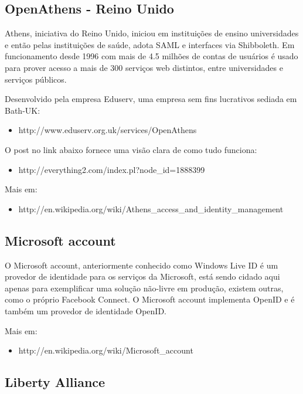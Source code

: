 \documentclass[11pt]{article}
\begin{document}
\subsection{OpenAthens - Reino Unido}

Athens, iniciativa do Reino Unido, iniciou em instituições de ensino
universidades e então pelas instituições de saúde, adota SAML e interfaces via
Shibboleth. Em funcionamento desde 1996 com mais de 4.5 milhões de contas de
usuários é usado para prover acesso a mais de 300 serviços web distintos,
entre universidades e serviços públicos.

Desenvolvido pela empresa Eduserv, uma empresa sem fins lucrativos sediada em
Bath-UK:

\begin{itemize}
  \item{http://www.eduserv.org.uk/services/OpenAthens}
\end{itemize}

O post no link abaixo fornece uma visão clara de como tudo funciona:

\begin{itemize}
  \item{http://everything2.com/index.pl?node\_id=1888399}
\end{itemize}

Mais em:
\begin{itemize}
  \item{http://en.wikipedia.org/wiki/Athens\_access\_and\_identity\_management}
\end{itemize}

\subsection{Microsoft account}

O Microsoft account, anteriormente conhecido como Windows Live ID é um
provedor de identidade para os serviços da Microsoft, está sendo cidado aqui
apenas para exemplificar uma solução não-livre em produção, existem outras,
como o próprio Facebook Connect. O Microsoft account implementa OpenID e é
também um provedor de identidade OpenID.

Mais em:
\begin{itemize}
  \item{http://en.wikipedia.org/wiki/Microsoft\_account}
\end{itemize}

\subsection{Liberty Alliance}
\end{document}
